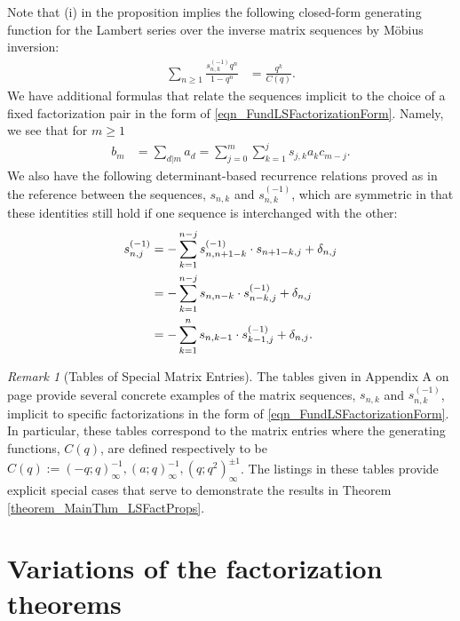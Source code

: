 \documentclass[10pt,reqno]{amsart}
\numberwithin{figure}{section}
\numberwithin{table}{section}
\theoremstyle{plain}
\numberwithin{theorem}{section}
\theoremstyle{remark}
\newtheorem{remark}[theorem]{Remark}
\begin{document}
Note that (i) in the proposition implies the following closed-form 
generating function for the Lambert series over the inverse matrix 
sequences by M\"obius inversion: 
\begin{align*} 
\sum_{n \geq 1} \frac{s_{n,k}^{(-1)} q^n}{1-q^n} & = \frac{q^k}{C(q)}. 
\end{align*} 
We have additional formulas that relate the sequences implicit to the 
choice of a fixed factorization pair in the form of 
\eqref{eqn_FundLSFactorizationForm}. 
Namely, we see that for $m \geq 1$ 
\begin{align*} 
b_m & = \sum_{d|m} a_d = \sum_{j=0}^m \sum_{k=1}^j s_{j,k} a_k c_{m-j}. 
\end{align*} 
We also have the following determinant-based recurrence relations proved as in the 
reference \cite[\S 2]{MERCA-SCHMIDT1} between the sequences, 
$s_{n,k}$ and $s_{n,k}^{(-1)}$, which are symmetric in that these 
identities still hold if one sequence is interchanged with the other: 
\begin{align} 
\label{eqn_snk_snkinv_det-based_recrels} 
s_{n,j}^{(-1)} & = - \sum_{k=1}^{n-j} s_{n,n+1-k}^{(-1)} \cdot s_{n+1-k,j} + 
     \delta_{n,j} \\ 
\notag 
     & = 
     - \sum_{k=1}^{n-j} s_{n,n-k} \cdot s_{n-k,j}^{(-1)} + \delta_{n,j} \\ 
\notag
     & = 
     -\sum_{k=1}^{n} s_{n,k-1} \cdot s_{k-1,j}^{(-1)} + \delta_{n,j}. 
\end{align} 

\begin{remark}[Tables of Special Matrix Entries]
The tables given in Appendix A on page \pageref{AppendixA_Tables_Figures} 
provide several concrete 
examples of the matrix sequences, $s_{n,k}$ and $s_{n,k}^{(-1)}$, implicit to 
specific factorizations in the form of \eqref{eqn_FundLSFactorizationForm}. 
In particular, these tables correspond to the matrix entries where the 
generating functions, $C(q)$, are defined respectively to be 
$C(q) := (-q; q)_{\infty}^{-1}, (a; q)_{\infty}^{-1}, (q; q^2)_{\infty}^{\pm 1}$. 
The listings in these tables provide explicit special cases that serve to 
demonstrate the results in Theorem \ref{theorem_MainThm_LSFactProps}. 
\end{remark} 

\section{Variations of the factorization theorems} 
\label{Section_VariantsOfTheFactThms}
\end{document}
